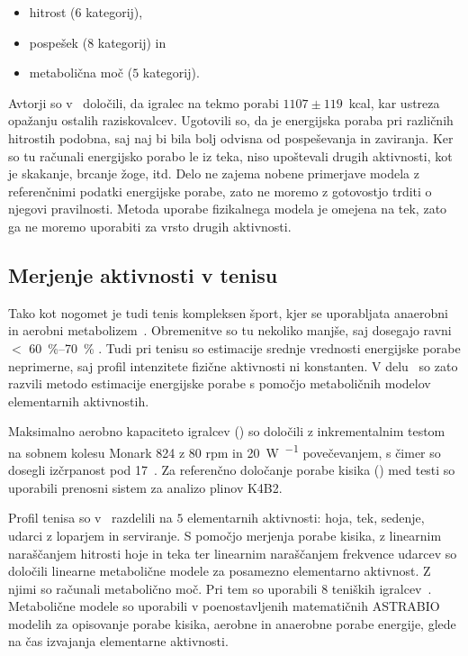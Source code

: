 \begin{itemize}
\item hitrost ($6$ kategorij),
\item pospešek ($8$ kategorij) in
\item metabolična moč ($5$ kategorij).
\end{itemize}

Avtorji so v~\cite{osgnach2010energy} določili, da igralec na tekmo porabi $1107 \pm 119$~kcal, kar ustreza opažanju ostalih raziskovalcev. Ugotovili so, da je energijska poraba pri različnih hitrostih podobna, saj naj bi bila bolj odvisna od pospeševanja in zaviranja. Ker so tu računali energijsko porabo le iz teka, niso upoštevali drugih aktivnosti, kot je skakanje, brcanje žoge, itd. Delo ne zajema nobene primerjave modela z referenčnimi podatki energijske porabe, zato ne moremo z gotovostjo trditi o njegovi pravilnosti. Metoda uporabe fizikalnega modela je omejena na tek, zato ga ne moremo uporabiti za vrsto drugih aktivnosti.





\subsection{Merjenje aktivnosti v tenisu}

Tako kot nogomet je tudi tenis kompleksen šport, kjer se uporabljata anaerobni in aerobni metabolizem~\cite{botton2011energy}. Obremenitve so tu nekoliko manjše, saj dosegajo ravni $<$ \SI{60}{\%}--\SI{70}{\%} \vomax. Tudi pri tenisu so estimacije srednje vrednosti energijske porabe neprimerne, saj profil intenzitete fizične aktivnosti ni konstanten. V delu~\cite{botton2011energy} so zato razvili metodo estimacije energijske porabe s pomočjo metaboličnih modelov elementarnih aktivnostih. 

Maksimalno aerobno kapaciteto igralcev (\vomax) so določili z inkrementalnim testom na sobnem kolesu Monark 824 z 80 rpm in \SI{20}{W.\min^{-1}} povečevanjem, s čimer so dosegli izčrpanost pod \SI{17}{\min}~\cite{botton2011energy}. Za referenčno določanje porabe kisika (\vo) med testi so uporabili prenosni sistem za analizo plinov K4B2. 

Profil tenisa so v~\cite{botton2011energy} razdelili na $5$ elementarnih aktivnosti: hoja, tek, sedenje, udarci z loparjem in serviranje. S pomočjo merjenja porabe kisika, z linearnim naraščanjem hitrosti hoje in teka ter linearnim naraščanjem frekvence udarcev so določili linearne metabolične modele za posamezno elementarno aktivnost. Z njimi so računali metabolično moč. Pri tem so uporabili $8$ teniških igralcev~\cite{botton2011energy}. Metabolične modele so uporabili v poenostavljenih matematičnih ASTRABIO modelih za opisovanje porabe kisika, aerobne in anaerobne porabe energije, glede na čas izvajanja elementarne aktivnosti. 

